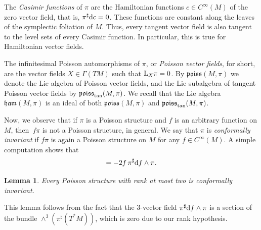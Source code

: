 \documentclass[pdftex]{sigma}%
\newcommand{\dd}{{\rm d}}
\numberwithin{equation}{section}
\newtheorem{Lemma}[Theorem]{Lemma}
\begin{document}
The \emph{Casimir functions} of $\pi$ are the Hamiltonian functions $c \in C^{\infty}(M)$ of the zero vector field, that is, $\pi^{\sharp}\dd{c} = 0$. These functions are constant along the leaves of the symplectic foliation of $M$. Thus, every tangent vector field is also tangent to the level sets of every Casimir function. In particular, this is true for Hamiltonian vector fields.

The infinitesimal Poisson automorphisms of $\pi$, or \emph{Poisson vector fields}, for short, are the vector fields $X \in \Gamma(TM)$ such that ${\rm L}_{X}\pi = 0$. By $\mathfrak{poiss}(M,\pi)$ we denote the Lie algebra of Poisson vector fields, and the Lie subalgebra of tangent Poisson vector fields by $\mathfrak{poiss}_{{\rm tan}}(M,\pi)$. We recall that the Lie algebra $\mathfrak{ham}(M,\pi)$ is an ideal of both $\mathfrak{poiss}(M,\pi)$ and $\mathfrak{poiss}_{{\rm tan}}(M,\pi)$.

Now, we observe that if $\pi$ is a Poisson structure and $f$ is an arbitrary function on $M$, then~$f\pi$ is not a Poisson structure, in general. We say that $\pi$ is \emph{conformally invariant} if $f\pi$ is again a Poisson structure on $M$ for any $f \in C^{\infty}(M)$. A simple computation shows that
 \begin{equation*}
 [f\pi, f\pi] = -2f\,\pi^{\sharp}\dd{f} \wedge \pi.
 \end{equation*}

\begin{Lemma}\label{lemma:conformally}
Every Poisson structure with rank at most two is conformally invariant.
\end{Lemma}

This lemma follows from the fact that the 3-vector field $\pi^{\sharp} \dd{f} \wedge \pi$ is a section of the bundle $\wedge^3(\pi^{\sharp}(T^{*}M))$, which is zero due to our rank hypothesis.
\end{document}
